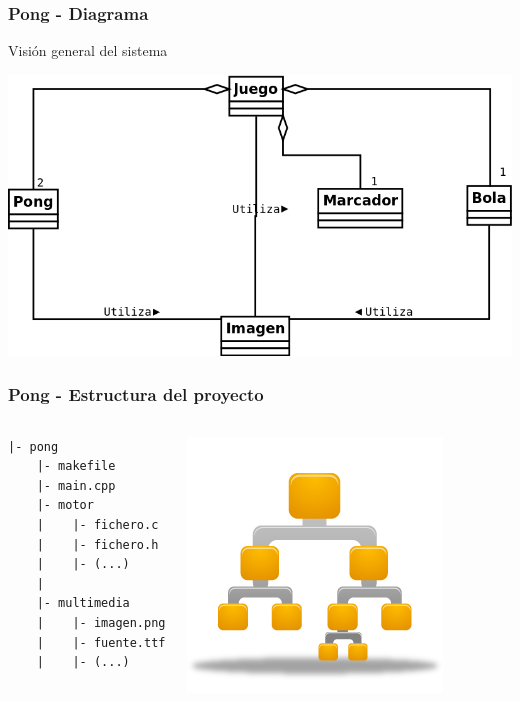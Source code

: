 \begin{frame}
	\frametitle{Pong - Diagrama}
	
    \begin{center}
        Visión general del sistema
    \end{center}
	
    \begin{center}
		\includegraphics[scale=0.25]{img/modulos.png}
	\end{center}	

\end{frame}

\begin{frame}[fragile]
	\frametitle{Pong - Estructura del proyecto}
    
    \begin{columns}[c]
	\column{175pt}

\begin{verbatim}
|- pong
    |- makefile
    |- main.cpp
    |- motor
    |    |- fichero.c
    |    |- fichero.h
    |    |- (...)
    |
    |- multimedia
    |    |- imagen.png
    |    |- fuente.ttf
    |    |- (...)
\end{verbatim}
	
	\column{125pt}
	\begin{center}
		\includegraphics[scale=0.4]{img/Binary-tree-256.png}
	\end{center}	
	
    \end{columns}

\end{frame}

